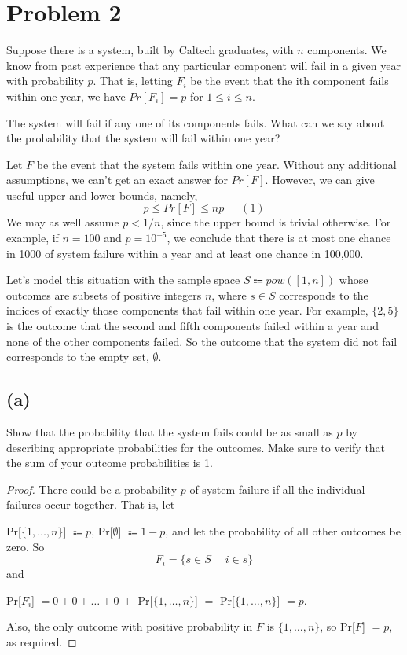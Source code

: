 \documentclass[14pt]{extarticle}
\begin{document}
\section{Problem 2}
Suppose there is a system, built by Caltech graduates, with $n$ components. We know from past experience that any particular component will fail in a given year with probability $p$. That is, letting $F_i$ be the event that the ith component fails within one year, we have $Pr[F_i] = p$ for $1 \leq i \leq n$.

The system will fail if any one of its components fails. What can we say about the probability that the system will fail within one year?

Let $F$ be the event that the system fails within one year. Without any additional assumptions, we can’t get an exact answer for $Pr[F]$. However, we can give useful upper and lower bounds, namely,
$$
p \leq Pr[F] \leq np \,\,\,\,\,\,\,\,\,(1)
$$
We may as well assume $p < 1/n$, since the upper bound is trivial otherwise. For example, if $n = 100$ and $p = 10^{-5}$, we conclude that there is at most one chance in 1000 of system failure within a year and at least one chance in 100,000.

Let’s model this situation with the sample space $S \Coloneqq pow([1,n])$ whose outcomes are subsets of positive integers $n$, where $s \in S$ corresponds to the indices of exactly those components that fail within one year. For example, $\{2, 5\}$ is the outcome that the second and fifth components failed within a year and none of the other components failed. So the outcome that the system did not fail corresponds to the empty set, $\emptyset$.

\subsection{(a)}
Show that the probability that the system fails could be as small as $p$ by describing appropriate probabilities for the outcomes. Make sure to verify that the sum of your outcome probabilities is 1.
\begin{proof}
There could be a probability $p$ of system failure if all the individual failures occur to­gether. That is, let 

Pr[$\{1, \ldots , n\}$] $\Coloneqq p$,  Pr[$\emptyset$] $\Coloneqq 1 - p$, and let the probability of all other outcomes be zero. 
So 
$$
F_i = \{s \in S \,\,\,|\,\,\, i \in s\}
$$ 
and 

Pr[$F_i$] $= 0 + 0 + \ldots + 0 \,+ $ Pr[$\{1, \ldots , n\}$] $=$ Pr[$\{1, \ldots , n\}$] $= p$.

Also, the only outcome with positive probability in $F$ is $\{1, \ldots, n\}$, so Pr[$F$] $= p$, as required.
\end{proof}
\end{document}
